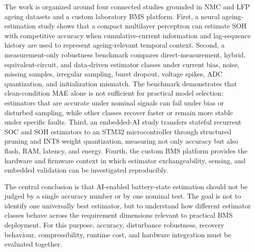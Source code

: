 \documentclass[
    a4paper,
    12pt,
    titlepage,
    bibliography=totoc,
    twoside=on,
    parskip=false,
    numbers=noenddot,
    cleardoublepage=empty,
    DIV=12,
    BCOR=12.0mm,
    headheight=36pt,
    headings=openright
]{scrreprt}
\begin{document}
The work is organized around four connected studies grounded in NMC and LFP ageing datasets and a custom laboratory BMS platform. First, a neural ageing-estimation study shows that a compact multilayer perceptron can estimate SOH with competitive accuracy when cumulative-current information and lag-sequence history are used to represent ageing-relevant temporal context. Second, a measurement-only robustness benchmark compares direct-measurement, hybrid, equivalent-circuit, and data-driven estimator classes under current bias, noise, missing samples, irregular sampling, burst dropout, voltage spikes, ADC quantization, and initialization mismatch. The benchmark demonstrates that clean-condition MAE alone is not sufficient for practical model selection: estimators that are accurate under nominal signals can fail under bias or disturbed sampling, while other classes recover faster or remain more stable under specific faults. Third, an embedded-AI study transfers stateful recurrent SOC and SOH estimators to an STM32 microcontroller through structured pruning and INT8 weight quantization, measuring not only accuracy but also flash, RAM, latency, and energy. Fourth, the custom BMS platform provides the hardware and firmware context in which estimator exchangeability, sensing, and embedded validation can be investigated reproducibly.

The central conclusion is that AI-enabled battery-state estimation should not be judged by a single accuracy number or by one nominal test. The goal is not to identify one universally best estimator, but to understand how different estimator classes behave across the requirement dimensions relevant to practical BMS deployment. For this purpose, accuracy, disturbance robustness, recovery behaviour, compressibility, runtime cost, and hardware integration must be evaluated together.

\tableofcontents
\cleardoublepage
\end{document}
